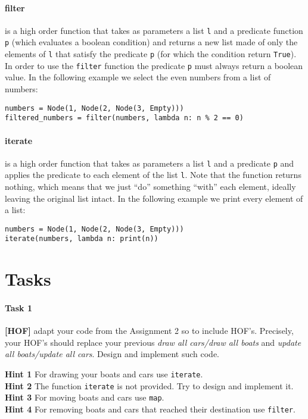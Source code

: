\documentclass[10pt,a4paper]{article}
\begin{document}
\paragraph{filter} is a high order function that takes as parameters a list \texttt{l} and a predicate function \texttt{p} (which evaluates a boolean condition) and returns a new list made of only the elements of \texttt{l} that satisfy the predicate \texttt{p} (for which the condition return \texttt{True}). In order to use the \texttt{filter} function the predicate \texttt{p} must always return a boolean value. In the following example we select the even numbers from a list of numbers:
\begin{lstlisting}[frame=single,basicstyle=\ttfamily]
numbers = Node(1, Node(2, Node(3, Empty)))
filtered_numbers = filter(numbers, lambda n: n % 2 == 0)
\end{lstlisting}

\paragraph{iterate} is a high order function that takes as parameters a list \texttt{l} and a predicate \texttt{p} and applies the predicate to each element of the list \texttt{l}. Note that the function returns nothing, which means that we just ``do'' something ``with'' each element, ideally leaving the original list intact. In the following example we print every element of a list:
\begin{lstlisting}[frame=single,basicstyle=\ttfamily]
numbers = Node(1, Node(2, Node(3, Empty)))
iterate(numbers, lambda n: print(n))
\end{lstlisting}
	
\section{Tasks}	
\paragraph{Task 1} \textbf{[HOF]} adapt your code from the Assignment 2 so to include HOF's. Precisely, your HOF's should replace your previous \textit{draw all cars/draw all boats} and \textit{update all boats/update all cars}. Design and implement such code.

\vspace{0.3cm}
\noindent
\textbf{Hint 1} For drawing your boats and cars use \texttt{iterate}. \\
\noindent
\textbf{Hint 2} The function \texttt{iterate} is not provided. Try to design and implement it.\\
\noindent
\textbf{Hint 3} For moving boats and cars use \texttt{map}.\\
\noindent
\textbf{Hint 4} For removing boats and cars that reached their destination use \texttt{filter}.\\
\end{document}
